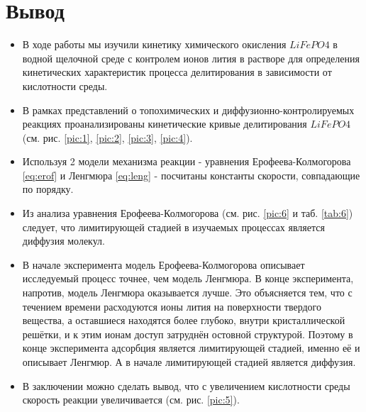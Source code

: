 \documentclass[a4paper,12pt]{article} %
\begin{document}
\section{Вывод}
\begin{itemize}
    \item В ходе работы мы изучили кинетику химического окисления $LiFePO4$ в водной щелочной среде с контролем ионов лития в растворе для определения кинетических характеристик процесса делитирования в зависимости от кислотности среды.
 \item В рамках представлений о топохимических и диффузионно-контролируемых реакциях проанализированы кинетические кривые делитирования $LiFePO4$ (см. рис. \ref{pic:1}, \ref{pic:2}, \ref{pic:3}, \ref{pic:4}). 
\item Используя 2 модели механизма реакции - уравнения Ерофеева-Колмогорова \eqref{eq:erof} и Ленгмюра \eqref{eq:leng} - посчитаны константы скорости, совпадающие по порядку.
\item Из анализа уравнения Ерофеева-Колмогорова (см. рис. \ref{pic:6} и таб. \ref{tab:6}) следует, что лимитирующей стадией в изучаемых процессах является диффузия молекул. 
\item В начале эксперимента модель Ерофеева-Колмогорова описывает исследуемый процесс точнее, чем модель Ленгмюра. В конце эксперимента, напротив, модель Ленгмюра оказывается лучше. Это объясняется тем, что с течением времени расходуются ионы лития на поверхности твердого вещества, а оставшиеся находятся более глубоко, внутри кристаллической решётки, и к этим ионам доступ затруднён остовной структурой. Поэтому в конце эксперимента адсорбция является лимитирующей стадией, именно её и описывает Ленгмюр. А в начале лимитирующей стадией является диффузия. 
\item В заключении можно сделать вывод, что с увеличением кислотности среды скорость реакции увеличивается (см. рис. \ref{pic:5}).
\end{itemize}
\end{document}
